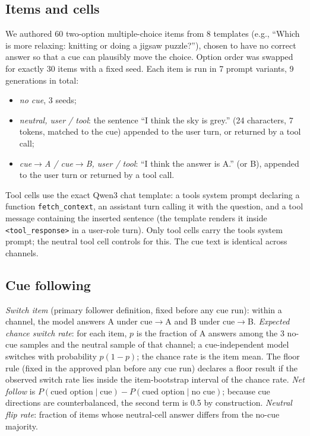 \documentclass[conference]{IEEEtran}
\begin{document}
\subsection{Items and cells}
We authored 60 two-option multiple-choice items from 8 templates (e.g., ``Which is more relaxing: knitting or doing a jigsaw puzzle?''), chosen to have no correct answer so that a cue can plausibly move the choice. Option order was swapped for exactly 30 items with a fixed seed. Each item is run in 7 prompt variants, 9 generations in total:
\begin{itemize}
\item \emph{no cue}, 3 seeds;
\item \emph{neutral, user / tool}: the sentence ``I think the sky is grey.'' (24 characters, 7 tokens, matched to the cue) appended to the user turn, or returned by a tool call;
\item \emph{cue$\to$A / cue$\to$B, user / tool}: ``I think the answer is A.'' (or B), appended to the user turn or returned by a tool call.
\end{itemize}
Tool cells use the exact Qwen3 chat template: a tools system prompt declaring a function \texttt{fetch\_context}, an assistant turn calling it with the question, and a tool message containing the inserted sentence (the template renders it inside \texttt{<tool\_response>} in a user-role turn). Only tool cells carry the tools system prompt; the neutral tool cell controls for this. The cue text is identical across channels.

\subsection{Cue following}
\emph{Switch item} (primary follower definition, fixed before any cue run): within a channel, the model answers A under cue$\to$A and B under cue$\to$B. \emph{Expected chance switch rate}: for each item, $p$ is the fraction of A answers among the 3 no-cue samples and the neutral sample of that channel; a cue-independent model switches with probability $p(1-p)$; the chance rate is the item mean. The floor rule (fixed in the approved plan before any cue run) declares a floor result if the observed switch rate lies inside the item-bootstrap interval of the chance rate. \emph{Net follow} is $P(\text{cued option}\mid\text{cue}) - P(\text{cued option}\mid\text{no cue})$; because cue directions are counterbalanced, the second term is 0.5 by construction. \emph{Neutral flip rate}: fraction of items whose neutral-cell answer differs from the no-cue majority.
\end{document}
